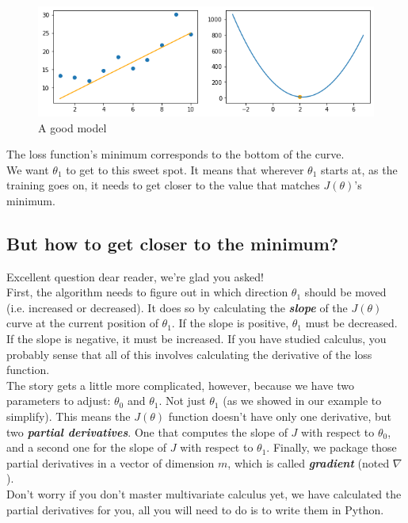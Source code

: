\begin{figure}[!h]
  \centering
  \includegraphics[scale=0.6]{assets/ex03_cost_3.png}
  \caption{A good model}
\end{figure}

The loss function's minimum corresponds to the bottom of the curve.\\
We want $\theta_1$ to get to this sweet spot.
It means that wherever $\theta_1$ starts at, as the training goes on, it needs to get closer to the value that matches $J(\theta)$'s minimum.

\subsection*{But how to get closer to the minimum?}
Excellent question dear reader, we're glad you asked!\\
\newline  
First, the algorithm needs to figure out in which direction $\theta_1$ should be moved (i.e. increased or decreased).
It does so by calculating the \textbf{\textit{slope}} of the $J(\theta)$ curve at the current position of $\theta_1$.
If the slope is positive, $\theta_1$ must be decreased.
If the slope is negative, it must be increased.
If you have studied calculus, you probably sense that all of this involves calculating the derivative of the loss function.\\
\newline
The story gets a little more complicated, however, because we have two parameters to adjust: $\theta_0$ and $\theta_1$.
Not just $\theta_1$ (as we showed in our example to simplify).
This means the $J(\theta)$ function doesn't have only one derivative, but two \textbf{\textit{partial derivatives}}.
One that computes the slope of $J$ with respect to $\theta_0$, and a second one for the slope of $J$ with respect to $\theta_1$.
Finally, we package those partial derivatives in a vector of dimension $m$, which is called \textbf{\textit{gradient}} (noted $\nabla$).\\
\newline
Don't worry if you don't master multivariate calculus yet, we have calculated the partial derivatives for you, all you will need to do is to write them in Python.  
